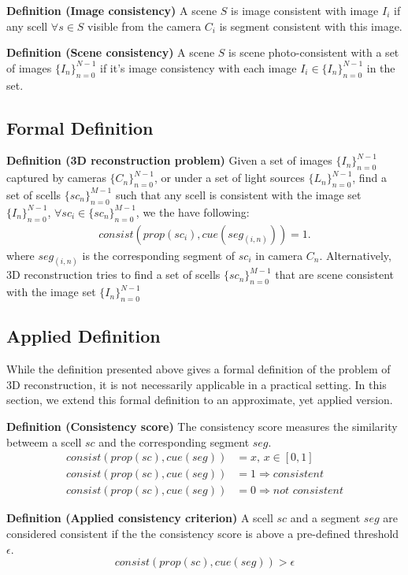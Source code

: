 \noindent\textbf{Definition (Image consistency)} A scene $S$ is image consistent with image $I_i$ if any scell $\forall s\in S$ visible from the camera $C_i$ is segment consistent with this image.

\noindent\textbf{Definition (Scene consistency)} A scene $S$ is scene photo-consistent with a set of images $\{I_n\}_{n=0}^{N-1}$ if it's image consistency with each image $I_i\in \{I_n\}_{n=0}^{N-1}$ in the set.

\subsection{Formal Definition}
\noindent\textbf{Definition (3D reconstruction problem)} Given a set of images $\{I_n\}_{n=0}^{N-1}$ captured by cameras $\{C_n\}_{n=0}^{N-1}$, or under a set of light sources $\{L_n\}_{n=0}^{N-1}$, find a set of scells $\{sc_n\}_{n=0}^{M-1}$ such that any scell is consistent with the image set $\{I_n\}_{n=0}^{N-1}$, \ie $\forall sc_i\in \{sc_n\}_{n=0}^{M-1}$, we the have following:
\begin{align*}
consist(prop(sc_i), cue(seg_{(i, n)})) = 1.
\end{align*}
where $seg_{(i, n)}$ is the corresponding segment of $sc_i$ in camera $C_n$. Alternatively, 3D reconstruction tries to find a set of scells $\{sc_n\}_{n=0}^{M-1}$ that are scene consistent with the image set $\{I_n\}_{n=0}^{N-1}$

\subsection{Applied Definition}
While the definition presented above gives a formal definition of the problem of 3D reconstruction, it is not necessarily applicable in a practical setting. In this section, we extend this formal definition to an approximate, yet applied version.

\noindent\textbf{Definition (Consistency score)} The consistency score measures the similarity betweem a scell $sc$ and the corresponding segment $seg$.
\begin{align*}
consist(prop(sc), cue(seg)) &= x \text{, } x\in[0, 1]\\
consist(prop(sc), cue(seg)) &= 1 \Rightarrow \textit{consistent}\\
consist(prop(sc), cue(seg)) &= 0 \Rightarrow \textit{not consistent}
\end{align*}

\noindent\textbf{Definition (Applied consistency criterion)} A scell $sc$ and a segment $seg$ are considered consistent if the the consistency score is above a pre-defined threshold $\epsilon$.
$$
consist(prop(sc), cue(seg)) > \epsilon
$$

